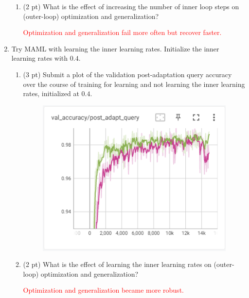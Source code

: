 \documentclass[12pt]{article}
\begin{document}
\begin{enumerate}
\begin{enumerate}[label=(\alph*)]
        \item (2 pt) What is the effect of increasing the number of inner loop steps on (outer-loop) optimization and generalization?
        
        \textcolor{red}{Optimization and generalization fail more often but recover faster.}

    \end{enumerate}

    \newpage
    \item Try MAML with learning the inner learning rates. Initialize the inner learning rates with $0.4$.
    \begin{enumerate}[label=(\alph*)]
        \item (3 pt) Submit a plot of the validation post-adaptation query accuracy over the course of training for learning and not learning the inner learning rates, initialized at $0.4$. 

\begin{figure}[H]
\centering
\includegraphics[width=\linewidth]{figures/2.5a.png}
\end{figure}

        \item (2 pt) What is the effect of learning the inner learning rates on (outer-loop) optimization and generalization?

        \textcolor{red}{Optimization and generalization became more robust.}

    \end{enumerate}
\end{enumerate}
\end{document}
